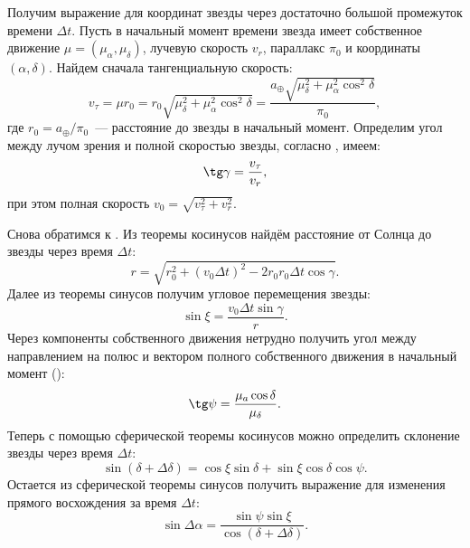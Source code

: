 Получим выражение для координат звезды через достаточно большой промежуток времени $\Delta t$. Пусть в начальный момент времени звезда имеет собственное движение $\mu = (\mu_\alpha, \mu_\delta)$, лучевую скорость $v_r$, параллакс $\pi_0$ и координаты $(\alpha, \delta)$. Найдем сначала тангенциальную скорость:
\begin{equation*}
    v_\tau =  \mu r_0 = r_0 \sqrt{ \mu_\delta^2 + \mu_\alpha^2 \cos^2 \delta} = \frac{a_\oplus \sqrt{ \mu_\delta^2 + \mu_\alpha^2 \cos^2 \delta}}{\pi_0},
\end{equation*}
где $r_0 = a_\oplus / \pi_0$~--- расстояние до звезды в начальный момент.
Определим угол между лучом зрения и полной скоростью звезды, согласно , имеем:
\begin{equation*}
    \tg \gamma = \frac{v_\tau}{v_r},
\end{equation*}
при этом полная скорость $v_0 = \sqrt{v_\tau^2 + v_r^2}$.

Снова обратимся к . Из теоремы косинусов найдём расстояние от Солнца до звезды через время $\Delta t$:
\begin{equation*}
    r = \sqrt{r_0^2 + (v_0 \Delta t)^2 - 2 r_0 r_0 \Delta t \cos \gamma}.
\end{equation*}
Далее из теоремы синусов получим угловое перемещения звезды:
\begin{equation*}
    \sin \xi = \frac{v_0 \Delta t \sin \gamma}{r}.
\end{equation*}
Через компоненты собственного движения нетрудно получить угол между направлением на полюс и вектором полного собственного движения в начальный момент ():
\begin{equation*}
    \tg \psi =  \frac{\mu_a \cos \delta}{\mu_\delta}.
\end{equation*}
Теперь с помощью сферической теоремы косинусов можно определить склонение звезды через время $\Delta t$:
\begin{equation*}
    \sin (\delta + \Delta \delta) = \cos \xi \sin \delta + \sin \xi \cos \delta \cos \psi.
\end{equation*}
Остается из сферической теоремы синусов получить выражение для изменения прямого восхождения за время $\Delta t$:
\begin{equation*}
    \sin \Delta \alpha = \frac{\sin \psi \sin \xi}{\cos (\delta + \Delta \delta)}.
\end{equation*}


